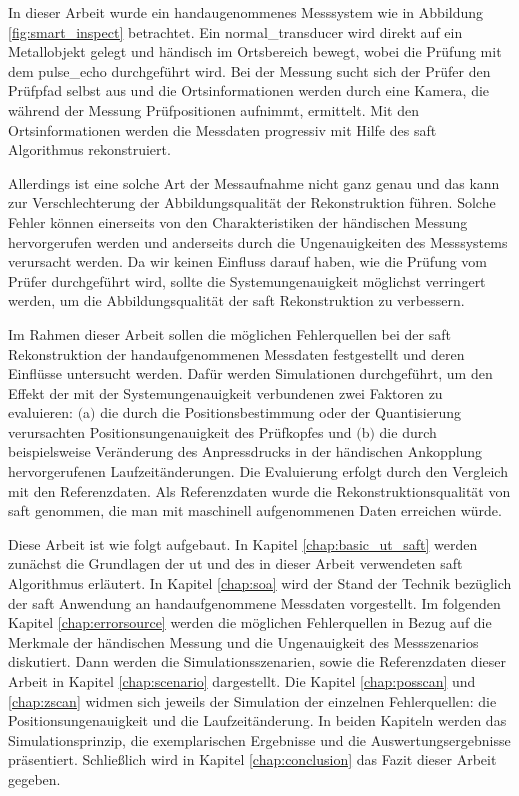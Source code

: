 In dieser Arbeit wurde ein handaugenommenes Messsystem wie in Abbildung \ref{fig:smart_inspect} betrachtet. Ein \gls{normal_transducer} wird direkt auf ein Metallobjekt gelegt und händisch im Ortsbereich bewegt, wobei die Prüfung mit dem \gls{pulse_echo} durchgeführt wird. Bei der Messung sucht sich der Prüfer den Prüfpfad selbst aus und die Ortsinformationen werden durch eine Kamera, die während der Messung Prüfpositionen aufnimmt, ermittelt. Mit den Ortsinformationen werden die Messdaten progressiv mit Hilfe des \acrshort{saft} Algorithmus rekonstruiert. \par
Allerdings ist eine solche Art der Messaufnahme nicht ganz genau und das kann zur Verschlechterung der Abbildungsqualität der Rekonstruktion führen. Solche Fehler können einerseits von den Charakteristiken der händischen Messung hervorgerufen werden und anderseits durch die Ungenauigkeiten des Messsystems verursacht werden. Da wir keinen Einfluss darauf haben, wie die Prüfung vom Prüfer durchgeführt wird, sollte die Systemungenauigkeit möglichst verringert werden, um die Abbildungsqualität der \acrshort{saft} Rekonstruktion zu verbessern. \par
Im Rahmen dieser Arbeit sollen die möglichen Fehlerquellen bei der \acrshort{saft} Rekonstruktion der handaufgenommenen Messdaten festgestellt und deren Einflüsse untersucht werden. Dafür werden Simulationen durchgeführt, um den Effekt der mit der Systemungenauigkeit verbundenen zwei Faktoren zu evaluieren: $($a$)$ die durch die Positionsbestimmung oder der Quantisierung verursachten Positionsungenauigkeit des Prüfkopfes und $($b$)$ die durch beispielsweise Veränderung des Anpressdrucks in der händischen Ankopplung hervorgerufenen Laufzeitänderungen. Die Evaluierung erfolgt durch den Vergleich mit den Referenzdaten. Als Referenzdaten wurde die Rekonstruktionsqualität von \acrshort{saft} genommen, die man mit maschinell aufgenommenen Daten erreichen würde.   \par
Diese Arbeit ist wie folgt aufgebaut. In Kapitel \ref{chap:basic_ut_saft} werden zunächst die Grundlagen der \acrshort{ut} und des in dieser Arbeit verwendeten \acrshort{saft} Algorithmus erläutert. In Kapitel \ref{chap:soa} wird der Stand der Technik bezüglich der \acrshort{saft} Anwendung an handaufgenommene Messdaten vorgestellt. Im folgenden Kapitel \ref{chap:errorsource} werden die möglichen Fehlerquellen in Bezug auf die Merkmale der händischen Messung und die Ungenauigkeit des Messszenarios diskutiert. Dann werden die Simulationsszenarien, sowie die Referenzdaten dieser Arbeit in Kapitel \ref{chap:scenario} dargestellt. Die Kapitel \ref{chap:posscan} und \ref{chap:zscan} widmen sich jeweils der Simulation der einzelnen Fehlerquellen: die Positionsungenauigkeit und die Laufzeitänderung. In beiden Kapiteln werden das Simulationsprinzip, die exemplarischen Ergebnisse und die Auswertungsergebnisse präsentiert. Schließlich wird in Kapitel \ref{chap:conclusion} das Fazit dieser Arbeit gegeben.


